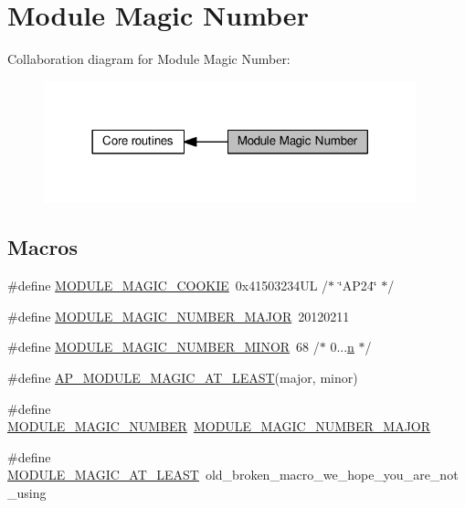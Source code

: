 \hypertarget{group__APACHE__CORE__MMN}{}\section{Module Magic Number}
\label{group__APACHE__CORE__MMN}
Collaboration diagram for Module Magic Number\+:
\nopagebreak
\begin{figure}[H]
\begin{center}
\leavevmode
\includegraphics[width=306pt]{group__APACHE__CORE__MMN}
\end{center}
\end{figure}
\subsection*{Macros}
\begin{DoxyCompactItemize}
\item 
\#define \hyperlink{group__APACHE__CORE__MMN_ga2c4ca3863cb05770bbe7d6a795bcaa3e}{M\+O\+D\+U\+L\+E\+\_\+\+M\+A\+G\+I\+C\+\_\+\+C\+O\+O\+K\+IE}~0x41503234\+U\+L /$\ast$ \char`\"{}\+A\+P24\char`\"{} $\ast$/
\item 
\#define \hyperlink{group__APACHE__CORE__MMN_ga317b5a0001d505331fafd3864636c2ad}{M\+O\+D\+U\+L\+E\+\_\+\+M\+A\+G\+I\+C\+\_\+\+N\+U\+M\+B\+E\+R\+\_\+\+M\+A\+J\+OR}~20120211
\item 
\#define \hyperlink{group__APACHE__CORE__MMN_ga588f30a3c70ecc64ad0db18393cc34f2}{M\+O\+D\+U\+L\+E\+\_\+\+M\+A\+G\+I\+C\+\_\+\+N\+U\+M\+B\+E\+R\+\_\+\+M\+I\+N\+OR}~68                  /$\ast$ 0...\hyperlink{pcregrep_8txt_ab232d334efb9173a12ae2940d035f460}{n} $\ast$/
\item 
\#define \hyperlink{group__APACHE__CORE__MMN_ga468ad60fde0659f1bf524800e430dc75}{A\+P\+\_\+\+M\+O\+D\+U\+L\+E\+\_\+\+M\+A\+G\+I\+C\+\_\+\+A\+T\+\_\+\+L\+E\+A\+ST}(major,  minor)
\item 
\#define \hyperlink{group__APACHE__CORE__MMN_gacf76a081f9ed23e16f6bdb03abe96ec7}{M\+O\+D\+U\+L\+E\+\_\+\+M\+A\+G\+I\+C\+\_\+\+N\+U\+M\+B\+ER}~\hyperlink{group__APACHE__CORE__MMN_ga317b5a0001d505331fafd3864636c2ad}{M\+O\+D\+U\+L\+E\+\_\+\+M\+A\+G\+I\+C\+\_\+\+N\+U\+M\+B\+E\+R\+\_\+\+M\+A\+J\+OR}
\item 
\#define \hyperlink{group__APACHE__CORE__MMN_ga43fc4012742e0e9aa4109b1c5925a8db}{M\+O\+D\+U\+L\+E\+\_\+\+M\+A\+G\+I\+C\+\_\+\+A\+T\+\_\+\+L\+E\+A\+ST}~old\+\_\+broken\+\_\+macro\+\_\+we\+\_\+hope\+\_\+you\+\_\+are\+\_\+not\+\_\+using
\end{DoxyCompactItemize}


